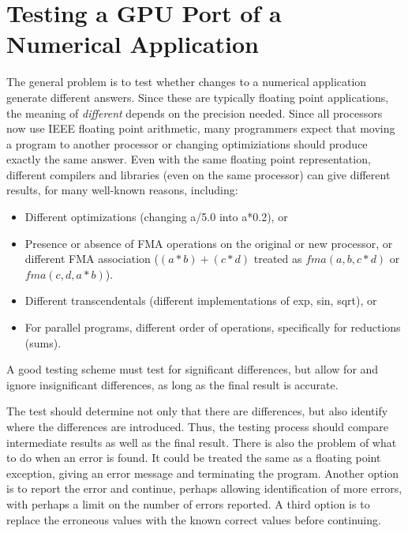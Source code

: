 \section{Testing a GPU Port of a Numerical Application}

The general problem is to test whether changes to a numerical application generate different answers.
Since these are typically floating point applications, the meaning of \emph{different} depends on the precision needed.
Since all processors now use IEEE floating point arithmetic\cite{goldberg.cs.91}, many programmers expect that moving a program to another processor or changing optimiziations should produce exactly the same answer.
Even with the same floating point representation, different compilers and libraries (even on the same processor) can give different results, for many well-known reasons, including:
\begin{itemize}
\item Different optimizations (changing a/5.0 into a*0.2), or
\item Presence or absence of FMA operations on the original or new processor, or different FMA association ($(a*b)+(c*d)$ treated as $\textit{fma}(a,b,c*d)$ or $\textit{fma}(c,d,a*b)$).
\item Different transcendentals (different implementations of exp, sin, sqrt), or
\item For parallel programs, different order of operations, specifically for reductions (sums).
\end{itemize}
A good testing scheme must test for significant differences, but allow for and ignore insignificant differences, as long as the final result is accurate.

The test should determine not only that there are differences, but also identify where the differences are introduced.
Thus, the testing process should compare intermediate results as well as the final result.
There is also the problem of what to do when an error is found.
It could be treated the same as a floating point exception, giving an error message and terminating the program.
Another option is to report the error and continue, perhaps allowing identification of more errors, with perhaps a limit on the number of errors reported.
A third option is to replace the erroneous values with the known correct values before continuing.

